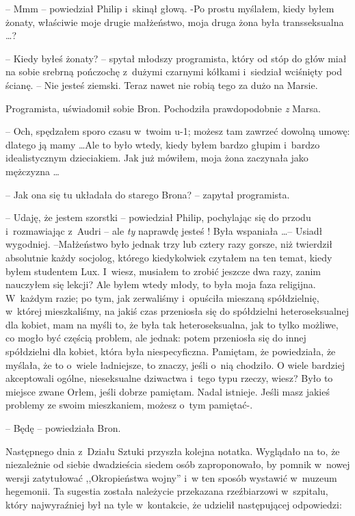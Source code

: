 \documentclass[oneside,polish,11pt,rmheadings]{mwbk}
\begin{document}
-- Mmm -- powiedział Philip i~skinął głową. -Po prostu myślałem, kiedy byłem żonaty, właściwie moje drugie małżeństwo, moja druga żona była transseksualna \ldots ? 

-- Kiedy byłeś żonaty? -- spytał młodszy programista, który od stóp do głów miał na sobie srebrną pończochę z~dużymi czarnymi kółkami i~siedział wciśnięty pod ścianę. -- Nie jesteś ziemski. Teraz nawet nie robią tego za dużo na Marsie. 

Programista, uświadomił sobie Bron. Pochodziła prawdopodobnie \textit{z }Marsa. 

-- Och, spędzałem sporo czasu w~twoim u-1; możesz tam zawrzeć dowolną umowę: dlatego ją mamy \ldots  Ale to było wtedy, kiedy byłem bardzo głupim i~bardzo idealistycznym dzieciakiem. Jak już mówiłem, moja żona zaczynała jako mężczyzna \ldots  

-- Jak ona się tu układała do starego Brona? -- zapytał programista. 

-- Udaję, że jestem szorstki -- powiedział Philip, pochylając się do przodu i~rozmawiając z~Audri -- ale \textit{ty }naprawdę jesteś ! Była wspaniała \ldots  -- Usiadł wygodniej. --Małżeństwo było jednak trzy lub cztery razy gorsze, niż twierdził absolutnie każdy socjolog, którego kiedykolwiek czytałem na ten temat, kiedy byłem studentem Lux. I~wiesz, musiałem to zrobić jeszcze dwa razy, zanim nauczyłem się lekcji? Ale byłem wtedy młody, to była moja faza religijna. W~każdym razie; po tym, jak zerwaliśmy i~opuściła mieszaną spółdzielnię, w~której mieszkaliśmy, na jakiś czas przeniosła się do spółdzielni heteroseksualnej dla kobiet, mam na myśli to, że była tak heteroseksualna, jak to tylko możliwe, co mogło być częścią problem, ale jednak: potem przeniosła się do innej spółdzielni dla kobiet, która była niespecyficzna. Pamiętam, że powiedziała, że myślała, że to o~wiele ładniejsze, to znaczy, jeśli o~nią chodziło. O wiele bardziej akceptowali ogólne, nieseksualne dziwactwa i~tego typu rzeczy, wiesz? Było to miejsce zwane Orłem, jeśli dobrze pamiętam. Nadal istnieje. Jeśli masz jakieś problemy ze swoim mieszkaniem, możesz o~tym pamiętać-. 

-- Będę -- powiedziała Bron. 

Następnego dnia z~Działu Sztuki przyszła kolejna notatka. Wyglądało na to, że niezależnie od siebie dwadzieścia siedem osób zaproponowało, by pomnik w~nowej wersji zatytułować ,,Okropieństwa wojny'' i~w ten sposób wystawić w~muzeum hegemonii. Ta sugestia została należycie przekazana rzeźbiarzowi w~szpitalu, który najwyraźniej był na tyle w~kontakcie, że udzielił następującej odpowiedzi: 
\end{document}
